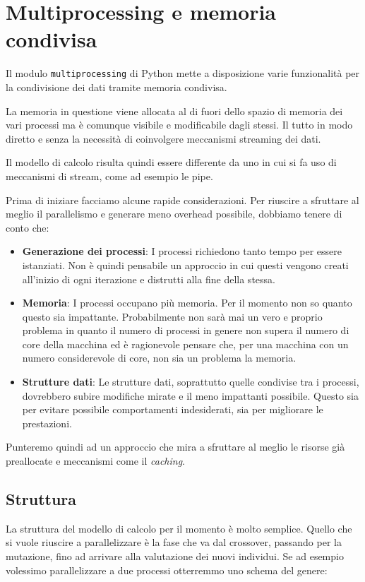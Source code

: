 \section{Multiprocessing e memoria condivisa}

Il modulo \verb|multiprocessing| di Python mette a disposizione varie
funzionalità per la condivisione dei dati tramite memoria condivisa.

La memoria in questione viene allocata al di fuori dello spazio di memoria dei
vari processi ma è comunque visibile e modificabile dagli stessi. Il tutto in
modo diretto e senza la necessità di coinvolgere meccanismi streaming dei dati.

Il modello di calcolo risulta quindi essere differente da uno in cui si fa uso
di meccanismi di stream, come ad esempio le pipe.

Prima di iniziare facciamo alcune rapide considerazioni. Per riuscire a
sfruttare al meglio il parallelismo e generare meno overhead possibile,
dobbiamo tenere di conto che:
\begin{itemize}
	\item \textbf{Generazione dei processi}: I processi richiedono tanto tempo
	      per essere istanziati. Non è quindi pensabile un approccio in cui
	      questi vengono creati all'inizio di ogni iterazione e distrutti alla
	      fine della stessa.
	\item \textbf{Memoria}: I processi occupano più memoria. Per il momento non
	      so quanto questo sia impattante. Probabilmente non sarà mai un vero e
	      proprio problema in quanto il numero di processi in genere non supera
	      il numero di core della macchina ed è ragionevole pensare che, per
	      una macchina con un numero considerevole di core, non sia un problema
	      la memoria.
	\item \textbf{Strutture dati}: Le strutture dati, soprattutto quelle
	      condivise tra i processi, dovrebbero subire modifiche mirate e il
	      meno impattanti possibile. Questo sia per evitare possibile
	      comportamenti indesiderati, sia per migliorare le prestazioni.
\end{itemize}
Punteremo quindi ad un approccio che mira a sfruttare al meglio le risorse già
preallocate e meccanismi come il \emph{caching}.

\subsection{Struttura}

La struttura del modello di calcolo per il momento è molto semplice. Quello che
si vuole riuscire a parallelizzare è la fase che va dal crossover, passando per
la mutazione, fino ad arrivare alla valutazione dei nuovi individui. Se ad
esempio volessimo parallelizzare a due processi otterremmo uno schema del
genere:

% 	

